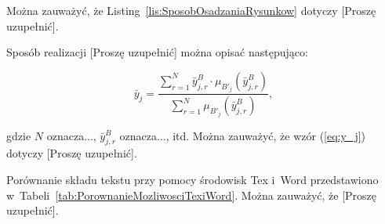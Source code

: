 \documentclass{PracaDyplomowa}
\begin{document}
\noindent Można zauważyć, że Listing~\ref{lis:SposobOsadzaniaRysunkow} dotyczy [Proszę uzupełnić].

Sposób realizacji [Proszę uzupełnić] można opisać następująco:

\begin{equation}
\label{eq:y_j}
{{\bar y}_j}=\frac{{\sum\limits_{r=1}^N {\bar y_{j,r}^B\cdot{\mu_{{{B'}_j}}}\left({\bar y_{j,r}^B}\right)}}}{{\sum\limits_{r=1}^N {{\mu_{{{B'}_j}}}\left({\bar y_{j,r}^B}\right)}}},
\end{equation}

\noindent gdzie $N$ oznacza..., ${\bar y_{j,r}^B}$ oznacza..., itd. Można zauważyć, że wzór (\ref{eq:y_j}) dotyczy [Proszę uzupełnić].

Porównanie składu tekstu przy pomocy środowisk Tex i~Word przedstawiono w~Tabeli~\ref{tab:PorownanieMozliwosciTexiWord}. Można zauważyć, że [Proszę uzupełnić].
\end{document}
